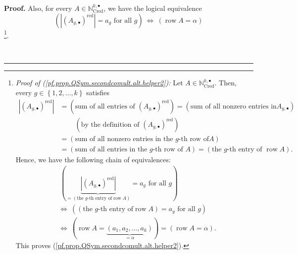 \documentclass
[numbers=enddot,12pt,final,onecolumn,notitlepage,abstracton]{scrartcl}%
\theoremstyle{definition}
\newenvironment{proof}[1][Proof]{\noindent\textbf{#1.} }{\ \rule{0.5em}{0.5em}}
\begin{document}
\begin{proof}
Also, for every $A\in\mathbb{N}_{\operatorname*{Cred}}^{k,\bullet}$, we
have the logical equivalence%
\begin{equation}
\left(  \left\vert \left(  A_{g,\bullet}\right)  ^{\operatorname*{red}%
}\right\vert =a_{g}\text{ for all }g\right)  \ \Longleftrightarrow\ \left(
\operatorname*{row}A=\alpha\right)
\label{pf.prop.QSym.secondcomult.alt.helper2}%
\end{equation}
\footnote{\textit{Proof of (\ref{pf.prop.QSym.secondcomult.alt.helper2}):} Let
$A\in\mathbb{N}_{\operatorname*{Cred}}^{k,\bullet}$. Then, every $g\in\left\{
1,2,\ldots,k\right\}  $ satisfies
\begin{align*}
\left\vert \left(  A_{g,\bullet}\right)  ^{\operatorname*{red}}\right\vert  &
=\left(  \text{sum of all entries of }\left(  A_{g,\bullet}\right)
^{\operatorname*{red}}\right)  =\left(  \text{sum of all nonzero entries in
}A_{g,\bullet}\right) \\
&  \ \ \ \ \ \ \ \ \ \ \left(  \text{by the definition of }\left(
A_{g,\bullet}\right)  ^{\operatorname*{red}}\right) \\
&  =\left(  \text{sum of all nonzero entries in the }g\text{-th row of
}A\right) \\
&  =\left(  \text{sum of all entries in the }g\text{-th row of }A\right)
=\left(  \text{the }g\text{-th entry of }\operatorname*{row}A\right)  .
\end{align*}
Hence, we have the following chain of equivalences:%
\begin{align*}
&  \ \left(  \underbrace{\left\vert \left(  A_{g,\bullet}\right)
^{\operatorname*{red}}\right\vert }_{=\left(  \text{the }g\text{-th entry of
}\operatorname*{row}A\right)  }=a_{g}\text{ for all }g\right) \\
&  \Longleftrightarrow\ \left(  \left(  \text{the }g\text{-th entry of
}\operatorname*{row}A\right)  =a_{g}\text{ for all }g\right) \\
&  \Longleftrightarrow\ \left(  \operatorname*{row}A=\underbrace{\left(
a_{1},a_{2},\ldots,a_{k}\right)  }_{=\alpha}\right)  =\left(
\operatorname*{row}A=\alpha\right)  .
\end{align*}
This proves (\ref{pf.prop.QSym.secondcomult.alt.helper2}).}.


\end{proof}
\end{document}
